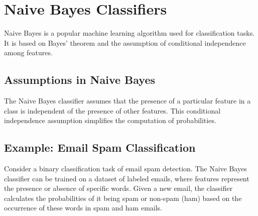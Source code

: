 \documentclass{article}
\begin{document}
\section{Naive Bayes Classifiers}
Naive Bayes is a popular machine learning algorithm used for classification tasks. It is based on Bayes' theorem and the assumption of conditional independence among features.

\subsection{Assumptions in Naive Bayes}
The Naive Bayes classifier assumes that the presence of a particular feature in a class is independent of the presence of other features. This conditional independence assumption simplifies the computation of probabilities.

\subsection{Example: Email Spam Classification}
Consider a binary classification task of email spam detection. The Naive Bayes classifier can be trained on a dataset of labeled emails, where features represent the presence or absence of specific words. Given a new email, the classifier calculates the probabilities of it being spam or non-spam (ham) based on the occurrence of these words in spam and ham emails.

\begin{center}
\end{center}
\end{document}
